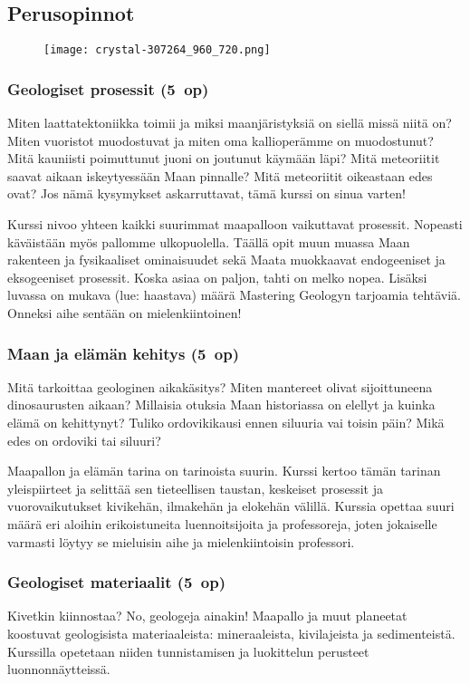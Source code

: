\documentclass[../ala_hataile.tex]{subfiles}
\begin{document}
\subsection*{Perusopinnot}
\begin{figure}[!b]
	\centering
	\texttt{[image: crystal-307264\_960\_720.png]}
\end{figure}
\subsubsection*{Geologiset prosessit (5~op)}
Miten laattatektoniikka toimii ja miksi maanjäristyksiä on siellä missä niitä on? Miten vuoristot muodostuvat ja miten oma kallioperämme on muodostunut? Mitä kauniisti poimuttunut juoni on joutunut käymään läpi? Mitä meteoriitit saavat aikaan iskeytyessään Maan pinnalle? Mitä meteoriitit oikeastaan edes ovat? Jos nämä kysymykset askarruttavat, tämä kurssi on sinua varten! 

Kurssi nivoo yhteen kaikki suurimmat maapalloon vaikuttavat prosessit. Nopeasti käväistään myös pallomme ulkopuolella. Täällä opit muun muassa Maan rakenteen ja fysikaaliset ominaisuudet sekä Maata muokkaavat endogeeniset ja eksogeeniset prosessit. Koska asiaa on paljon, tahti on melko nopea. Lisäksi luvassa on mukava (lue: haastava) määrä Mastering Geologyn tarjoamia tehtäviä. Onneksi aihe sentään on mielenkiintoinen!

\subsubsection*{Maan ja elämän kehitys (5~op)}
Mitä tarkoittaa geologinen aikakäsitys? Miten mantereet olivat sijoittuneena dinosaurusten aikaan? Millaisia otuksia Maan historiassa on elellyt ja kuinka elämä on kehittynyt? Tuliko ordoviki\-kausi ennen siluuria vai toisin päin? Mikä edes on ordoviki tai siluuri?

Maapallon ja elämän tarina on tarinoista suurin. Kurssi kertoo tämän tarinan yleispiirteet ja selittää sen tieteellisen taustan, keskeiset prosessit ja vuorovaikutukset kivikehän, ilmakehän ja elokehän välillä. Kurssia opettaa suuri määrä eri aloihin erikoistuneita luennoitsijoita ja professoreja, joten jokaiselle varmasti löytyy se mieluisin aihe ja mielenkiintoisin professori. 
   
\subsubsection*{Geologiset materiaalit (5~op)}
Kivetkin kiinnostaa? No, geologeja ainakin! Maapallo ja muut planeetat koostuvat geologisista materiaaleista: mineraaleista, kivilajeista ja sedimenteistä. Kurssilla opetetaan niiden tunnistamisen ja luokittelun perusteet luonnonnäytteissä. 
\end{document}
